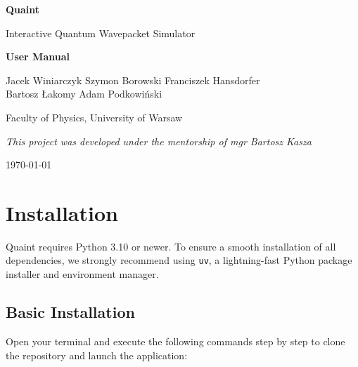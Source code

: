 \documentclass[11pt, a4paper]{article}
\begin{document}
\begin{titlepage}
    \centering
    \vspace*{4cm}

    {\fontsize{40}{48}\selectfont \textbf{Quaint}\par}
    \vspace{1cm}

    {\huge Interactive Quantum Wavepacket Simulator\par}
    \vspace{0.5cm}
    {\Large \textbf{User Manual}\par}

    \vspace{3.5cm}

    {\Large
        Jacek Winiarczyk \quad
        Szymon Borowski \quad
        Franciszek Hansdorfer \\[0.5em]
        Bartosz Łakomy \quad
        Adam Podkowiński
        \par}

    \vspace{1.5cm}

    {\large Faculty of Physics, University of Warsaw\par}
    \vspace{1cm}
    {\normalsize \textit{This project was developed under the mentorship of mgr Bartosz Kasza}\par}

    \vfill

    {\large \today\par}
\end{titlepage}

\newpage

\tableofcontents

\newpage

\section{Installation}
Quaint requires Python 3.10 or newer. To ensure a smooth installation of all dependencies, we strongly recommend using \texttt{uv}, a lightning-fast Python package installer and environment manager.

\subsection{Basic Installation}
Open your terminal and execute the following commands step by step to clone the repository and launch the application:
\end{document}
